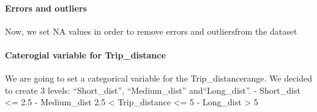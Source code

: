 \documentclass[
  18pt,
  a4paper]{article}
\newenvironment{Shaded}{\begin{snugshade}}{\end{snugshade}}
\newcommand{\CommentTok}[1]{\textcolor[rgb]{0.56,0.35,0.01}{\textit{#1}}}
\newcommand{\DecValTok}[1]{\textcolor[rgb]{0.00,0.00,0.81}{#1}}
\newcommand{\FloatTok}[1]{\textcolor[rgb]{0.00,0.00,0.81}{#1}}
\newcommand{\KeywordTok}[1]{\textcolor[rgb]{0.13,0.29,0.53}{\textbf{#1}}}
\newcommand{\NormalTok}[1]{#1}
\newcommand{\OperatorTok}[1]{\textcolor[rgb]{0.81,0.36,0.00}{\textbf{#1}}}
\newcommand{\OtherTok}[1]{\textcolor[rgb]{0.56,0.35,0.01}{#1}}
\newcommand{\StringTok}[1]{\textcolor[rgb]{0.31,0.60,0.02}{#1}}
\begin{document}
\begin{Shaded}
\end{Shaded}

\hypertarget{errors-and-outliers}{%
\paragraph{Errors and outliers}\label{errors-and-outliers}}

Now, we set NA values in order to remove errors and outliersfrom the
dataset

\begin{Shaded}
\end{Shaded}

\hypertarget{caterogial-variable-for-trip_distance}{%
\paragraph{Caterogial variable for
Trip\_distance}\label{caterogial-variable-for-trip_distance}}

We are going to set a categorical variable for the Trip\_distancerange.
We decided to create 3 levels: ``Short\_dist'', ``Medium\_dist''
and``Long\_dist''. - Short\_dist \textless= 2.5 - Medium\_dist 2.5
\textless{} Trip\_distance \textless= 5 - Long\_dist \textgreater{} 5

\begin{Shaded}
\end{Shaded}
\end{document}

